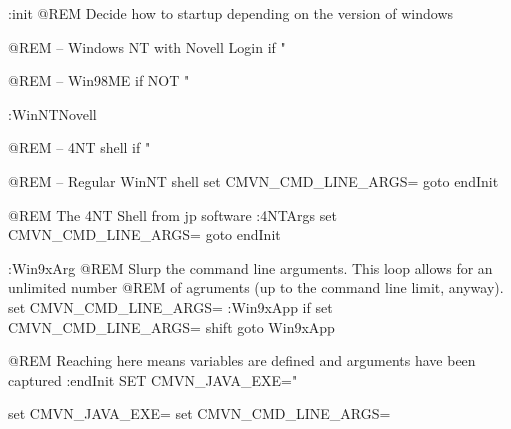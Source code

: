 \documentclass[a4paper,12pt,english,oneside,halfparskip]{scrartcl}
\newcommand{\code}[1]{\texttt{#1}}
\begin{document}
\begin{Cmdline}[caption={Windows Command Shell wrapper: \code{cmvn.bat}}]
:init
@REM Decide how to startup depending on the version of windows

@REM -- Windows NT with Novell Login
if "%

@REM -- Win98ME
if NOT "%

:WinNTNovell

@REM -- 4NT shell
if "%

@REM -- Regular WinNT shell
set CMVN_CMD_LINE_ARGS=%
goto endInit

@REM The 4NT Shell from jp software
:4NTArgs
set CMVN_CMD_LINE_ARGS=%
goto endInit

:Win9xArg
@REM Slurp the command line arguments.  This loop allows for an unlimited number
@REM of agruments (up to the command line limit, anyway).
set CMVN_CMD_LINE_ARGS=
:Win9xApp
if %
set CMVN_CMD_LINE_ARGS=%
shift
goto Win9xApp

@REM Reaching here means variables are defined and arguments have been captured
:endInit
SET CMVN_JAVA_EXE="%


set CMVN_JAVA_EXE=
set CMVN_CMD_LINE_ARGS=
\end{Cmdline}
\end{document}
